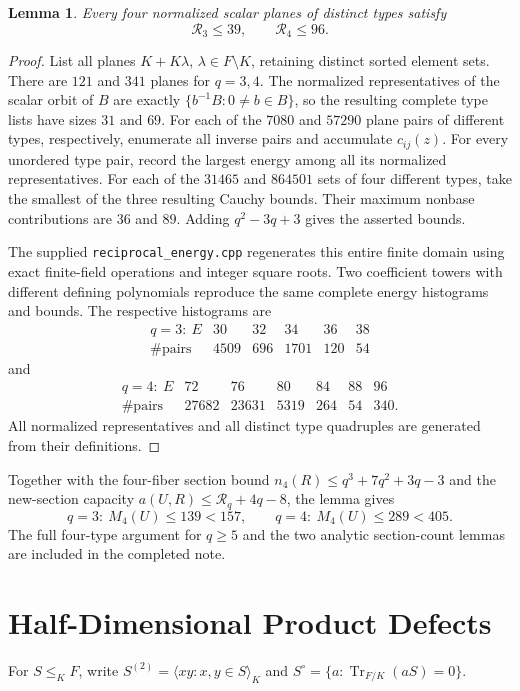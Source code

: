 \documentclass[12pt,letterpaper,onecolumn]{article}
\newtheorem{lemma}[theorem]{Lemma}
\theoremstyle{definition}
\theoremstyle{remark}
\DeclareMathOperator{\Tr}{Tr}
\begin{document}
\begin{lemma}\label{lem:core-reciprocal-small}
Every four normalized scalar planes of distinct types satisfy
\[
\mathcal R_3\le39,\qquad \mathcal R_4\le96.
\]
\end{lemma}
\begin{proof}
List all planes \(K+K\lambda\), \(\lambda\in F\setminus K\), retaining distinct sorted element sets.
There are \(121\) and \(341\) planes for \(q=3,4\).
The normalized representatives of the scalar orbit of \(B\) are exactly
\(\{b^{-1}B:0\ne b\in B\}\), so the resulting complete type lists have sizes \(31\) and \(69\).
For each of the \(7080\) and \(57290\) plane pairs of different types, respectively, enumerate all inverse pairs and accumulate \(c_{ij}(z)\).
For every unordered type pair, record the largest energy among all its normalized representatives.
For each of the \(31465\) and \(864501\) sets of four different types, take the smallest of the three resulting Cauchy bounds.
Their maximum nonbase contributions are \(36\) and \(89\).
Adding \(q^2-3q+3\) gives the asserted bounds.

The supplied \texttt{reciprocal\_energy.cpp} regenerates this entire finite domain using exact finite-field operations and integer square roots.
Two coefficient towers with different defining polynomials reproduce the same complete energy histograms and bounds.
The respective histograms are
\[
\begin{array}{c|rrrrr}
q=3:\ E&30&32&34&36&38\\
\#\text{pairs}&4509&696&1701&120&54
\end{array}
\]
and
\[
\begin{array}{c|rrrrrr}
q=4:\ E&72&76&80&84&88&96\\
\#\text{pairs}&27682&23631&5319&264&54&340.
\end{array}
\]
All normalized representatives and all distinct type quadruples are generated from their definitions.
\end{proof}

Together with the four-fiber section bound
\(n_4(R)\le q^3+7q^2+3q-3\) and the new-section capacity
\(a(U,R)\le\mathcal R_q+4q-8\), the lemma gives
\[
q=3:\ M_4(U)\le139<157,\qquad
q=4:\ M_4(U)\le289<405.
\]
The full four-type argument for \(q\ge5\) and the two analytic section-count lemmas are included in the completed note.

\section{Half-Dimensional Product Defects}
For \(S\le_KF\), write \(S^{(2)}=\langle xy:x,y\in S\rangle_K\) and
\(S^\circ=\{a:\Tr_{F/K}(aS)=0\}\).
\end{document}
